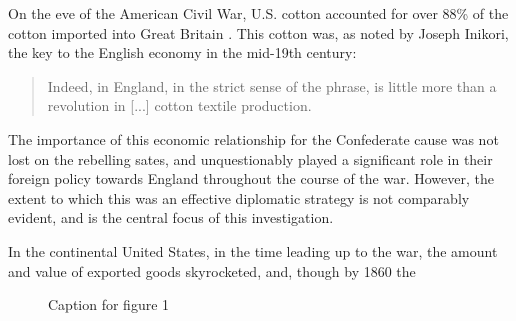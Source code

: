 
\autocites(The data for figure \ref{fig:1} comes from:)()[(Total Exports)][Table A-III]{northeconomicgrowth1966}[(Cotton Exports)][Part 2, Table 2]{u.s.congressImportsduties1884}
On the eve of the American Civil War, U.S. cotton accounted for over 88\% of the cotton imported into Great Britain \autocite[40]{baileyOtherSide1994}. This 
cotton was, as noted by Joseph Inikori, the key to the English economy in the mid-19th century: 
\begin{quote}
    Indeed,  in England, in the strict sense of the phrase, is little more than a revolution in [...] cotton textile production.
    \autocite[Joseph Inikori, {The Slave Trade and Revolution in Cotton Textile Production in England}, quoted in][40]{baileyOtherSide1994}
\end{quote}
The importance of this economic relationship for the Confederate cause was not lost on the rebelling sates, and unquestionably played a significant role in their 
foreign policy towards England throughout the course of the war. However, the extent to which this was an effective diplomatic strategy is not comparably evident,
and is the central focus of this investigation. 


In the continental United States, in the time leading up to the war, the amount and value of exported goods skyrocketed, and, though by 1860 the 

\begin{figure}
    \centering
    \subfloat[caption]{
        
        \label{fig:subfig1}
    }
    \hfill
    \subfloat[caption]{
        
        \label{fig:subfig2}
    }
    \caption{Caption for figure 1}
    \label{fig:1}
\end{figure}